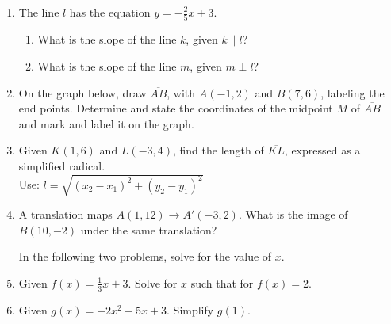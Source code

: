 \begin{enumerate}
\newpage
\item The line $l$ has the equation $y=-\frac{2}{5} x+3$.
\begin{enumerate}
  \item What is the slope of the line $k$, given $k \parallel l$?
  \vspace{1.5cm}
  \item What is the slope of the line $m$, given $m \perp l$?
  \vspace{1.5cm}
\end{enumerate}

\item On the graph below, draw $\overline{AB}$, with $A(-1,2)$ and $B(7,6)$, labeling the end points. Determine and state the coordinates of the midpoint $M$ of $\overline{AB}$ and mark and label it on the graph.
\begin{flushleft}
\end{flushleft}

\item Given $K(1,6)$ and $L(-3,4)$, find the length of $\overline{KL}$, expressed as a simplified radical.\\[0.25cm]
Use: $l=\sqrt{(x_2-x_1)^2+(y_2-y_1)^2}$
    \vspace{4cm}

\newpage
\item A translation maps $A(1,12) \rightarrow A'(-3,2)$. What is the image of $B(10,-2)$ under the same translation?  \vspace{3cm}

In the following two problems, solve for the value of $x$.
\vspace{4cm}

\item Given $f(x)=\frac{1}{3} x+3$. Solve for $x$ such that for $f(x)=2$. \vspace{4cm}
\item Given $g(x)=-2x^2-5x+3$. Simplify $g(1)$. \vspace{2cm}


\end{enumerate}
